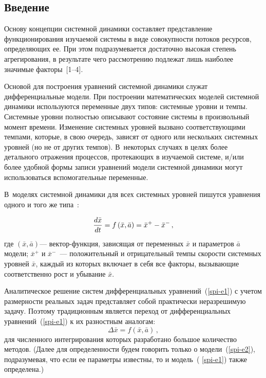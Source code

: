 {\begin{multicols}{2}
\section{Введение} %

  Основу концепции системной динамики со\-став\-ляет представление
функционирования изуча\-емой системы в виде совокупности потоков ресурсов,
определяющих ее. При этом подразумевается достаточно высокая степень
агрегирования, в результате чего рассмотрению подлежат лишь наиболее
значимые факторы~[1--4].

  Основой для построения уравнений системной динамики служат
дифференциальные модели. При построении математических моделей
системной динамики используются переменные двух типов: системные уровни
и темпы. Системные уровни полностью описывают состояние системы в
произвольный момент времени. Изменение системных уровней вызвано
соответствующими темпами, которые, в свою очередь, зависят от одного или
нескольких системных уровней (но не от других темпов). В~некоторых случаях
в целях более детального отражения процессов, протекающих в изучаемой
системе, и/или более удобной формы записи уравнений модели системной
динамики могут использоваться вспомогательные переменные.

  В~моделях системной динамики для всех системных уровней пишутся
уравнения одного и того же типа~\cite{spi-4, spi-1}:

\noindent
\begin{equation}
\displaystyle\frac{\displaystyle d\bar{x}\mathstrut}{\displaystyle dt\mathstrut} = f \left( \bar{x}, \bar{a}\right) = \bar{x}^+ - \bar{x}^-\,,
\label{spi-e1}
\end{equation}
где $\left( \bar{x}, \bar{a}\right)$--- век\-тор-функ\-ция, зависящая от переменных
$\bar{x}$ и параметров $\bar{a}$ модели; $\bar{x}^+$ и $\bar{x}^-$~---
положительный и отрицательный темпы скорости системных уровней
$\bar{x}$, каждый из которых включает в себя все факторы, вызывающие
соответственно рост и убывание $\bar{x}$.

  Аналитическое решение систем дифференциальных уравнений~(\ref{spi-e1})
с учетом размерности реальных задач представляет собой практически
неразрешимую задачу. Поэтому традиционным является переход от
дифференциальных уравнений~(\ref{spi-e1}) к их разностным аналогам:
\begin{equation}
\Delta \bar{x} = f \left( \bar{x}, \bar{a}\right)\,,
\label{spi-e2}
\end{equation}
для численного интегрирования которых разработано большое количество
методов. (Далее для определенности будем говорить только о
модели~(\ref{spi-e2}), подразумевая, что если ее параметры известны, то и
модель~( \ref{spi-e1}) также определена.)


\end{multicols}}
